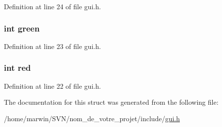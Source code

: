 Definition at line 24 of file gui.\-h.

\hypertarget{structcolor_a6e208843f894f38fa7644608917a2a41}{
\subsubsection[{green}]{\setlength{\rightskip}{0pt plus 5cm}int green}}\label{structcolor_a6e208843f894f38fa7644608917a2a41}


Definition at line 23 of file gui.\-h.

\hypertarget{structcolor_a6761340706096510fd89edca40a63b9b}{
\subsubsection[{red}]{\setlength{\rightskip}{0pt plus 5cm}int red}}\label{structcolor_a6761340706096510fd89edca40a63b9b}


Definition at line 22 of file gui.\-h.



The documentation for this struct was generated from the following file\-:\begin{DoxyCompactItemize}
\item 
/home/marwin/\-S\-V\-N/nom\-\_\-de\-\_\-votre\-\_\-projet/include/\hyperlink{gui_8h}{gui.\-h}\end{DoxyCompactItemize}

